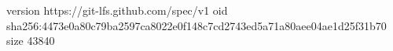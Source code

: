 version https://git-lfs.github.com/spec/v1
oid sha256:4473e0a80c79ba2597ca8022e0f148c7cd2743ed5a71a80aee04ae1d25f31b70
size 43840
